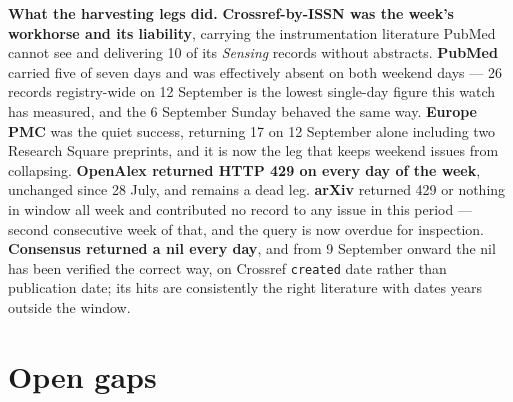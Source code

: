 \documentclass[10pt]{article}
\begin{document}
\vspace{1.5mm}
\textbf{What the harvesting legs did.} \textbf{Crossref-by-ISSN was the week's workhorse
and its liability}, carrying the instrumentation literature PubMed cannot see and
delivering 10 of its \textit{Sensing} records without abstracts. \textbf{PubMed} carried
five of seven days and was effectively absent on both weekend days --- 26 records
registry-wide on 12 September is the lowest single-day figure this watch has measured, and
the 6 September Sunday behaved the same way. \textbf{Europe PMC} was the quiet success,
returning 17 on 12 September alone including two Research Square preprints, and it is now
the leg that keeps weekend issues from collapsing. \textbf{OpenAlex returned HTTP 429 on
every day of the week}, unchanged since 28 July, and remains a dead leg. \textbf{arXiv}
returned 429 or nothing in window all week and contributed no record to any issue in this
period --- second consecutive week of that, and the query is now overdue for inspection.
\textbf{Consensus returned a nil every day}, and from 9 September onward the nil has been
verified the correct way, on Crossref \texttt{created} date rather than publication date;
its hits are consistently the right literature with dates years outside the window.

\vspace{2mm}
\section*{\sffamily\bfseries\color{Deep}Open gaps}
\vspace{-1.5mm}{\color{Teal}\rule{\linewidth}{1.1pt}}\vspace{2.5mm}
\end{document}
